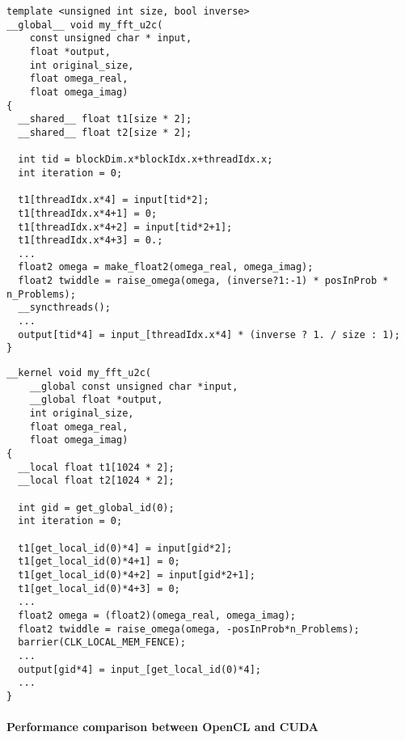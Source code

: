 \documentclass[english,11pt,a4paper,table]{article} %
\begin{document}
\begin{minipage}[t]{.48\textwidth}
	\begin{verbatim}
template <unsigned int size, bool inverse>
__global__ void my_fft_u2c(
	const unsigned char * input,
	float *output,
	int original_size,
	float omega_real,
	float omega_imag)
{
  __shared__ float t1[size * 2];
  __shared__ float t2[size * 2];

  int tid = blockDim.x*blockIdx.x+threadIdx.x;
  int iteration = 0;

  t1[threadIdx.x*4] = input[tid*2];
  t1[threadIdx.x*4+1] = 0;
  t1[threadIdx.x*4+2] = input[tid*2+1];
  t1[threadIdx.x*4+3] = 0.;
  ...
  float2 omega = make_float2(omega_real, omega_imag);
  float2 twiddle = raise_omega(omega, (inverse?1:-1) * posInProb * n_Problems);
  __syncthreads();
  ...
  output[tid*4] = input_[threadIdx.x*4] * (inverse ? 1. / size : 1);
}
\end{verbatim}
\end{minipage}\hfill%
\begin{minipage}[t]{.48\textwidth}
	\begin{verbatim}
__kernel void my_fft_u2c(
    __global const unsigned char *input,
    __global float *output,
    int original_size,
    float omega_real, 
    float omega_imag)
{
  __local float t1[1024 * 2];
  __local float t2[1024 * 2];

  int gid = get_global_id(0);
  int iteration = 0;

  t1[get_local_id(0)*4] = input[gid*2];
  t1[get_local_id(0)*4+1] = 0;
  t1[get_local_id(0)*4+2] = input[gid*2+1];
  t1[get_local_id(0)*4+3] = 0;
  ...
  float2 omega = (float2)(omega_real, omega_imag);
  float2 twiddle = raise_omega(omega, -posInProb*n_Problems);
  barrier(CLK_LOCAL_MEM_FENCE);
  ...
  output[gid*4] = input_[get_local_id(0)*4];
  ...
}
\end{verbatim}
\end{minipage}%

\paragraph{Performance comparison between OpenCL and CUDA}\mbox{}\\
\end{document}
